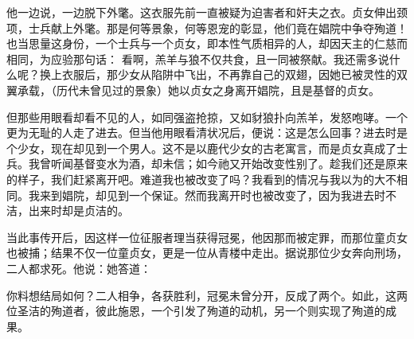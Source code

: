 他一边说，一边脱下外氅。这衣服先前一直被疑为迫害者和奸夫之衣。贞女伸出颈项，士兵献上外氅。那是何等景象，何等恩宠的彰显，他们竟在娼院中争夺殉道！也当思量这身份，一个士兵与一个贞女，即本性气质相异的人，却因天主的仁慈而相同，为应验那句话：  看啊，羔羊与狼不仅共食，且一同被祭献。我还需多说什么呢？换上衣服后，那少女从陷阱中飞出，不再靠自己的双翅，因她已被灵性的双翼承载，（历代未曾见过的景象）她以贞女之身离开娼院，且是基督的贞女。\par

但那些用眼看却看不见的人，如同强盗抢掠，又如豺狼扑向羔羊，发怒咆哮。一个更为无耻的人走了进去。但当他用眼看清状况后，便说：这是怎么回事？进去时是个少女，现在却见到一个男人。这不是以鹿代少女的古老寓言，而是贞女真成了士兵。我曾听闻基督变水为酒，却未信；如今祂又开始改变性别了。趁我们还是原来的样子，我们赶紧离开吧。难道我也被改变了吗？我看到的情况与我以为的大不相同。我来到娼院，却见到一个保证。然而我离开时也被改变了，因为我进去时不洁，出来时却是贞洁的。\par

当此事传开后，因这样一位征服者理当获得冠冕，他因那而被定罪，而那位童贞女也被捕；结果不仅一位童贞女，更是一位从青楼中走出。据说那位少女奔向刑场，二人都求死。他说：她答道：\par

你料想结局如何？二人相争，各获胜利，冠冕未曾分开，反成了两个。如此，这两位圣洁的殉道者，彼此施恩，一个引发了殉道的动机，另一个则实现了殉道的成果。\par

